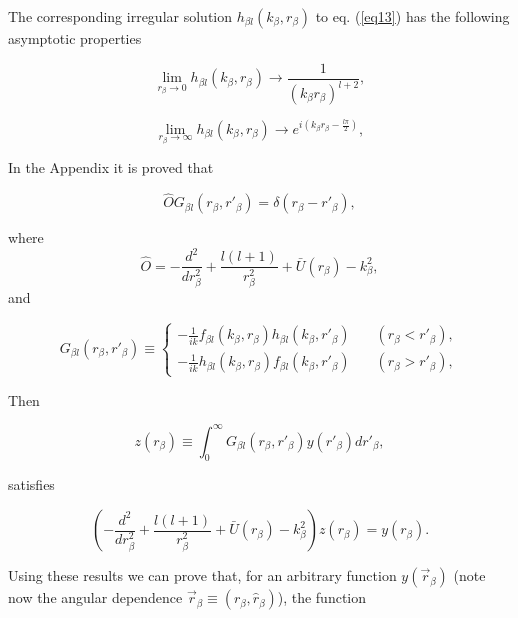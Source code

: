 The corresponding irregular solution $h_{\beta l}( k_ \beta, r_ \beta)$ to eq. (\ref{eq13}) has the following asymptotic properties


 \begin{equation}\label{eq16}
\lim_{r_\beta \rightarrow 0} h_{\beta l}( k_ \beta, r_ \beta) \longrightarrow
\frac{1}{(k_ \beta r_ \beta)^{l+2}},
\end{equation}

 \begin{equation}\label{eq17}
\lim_{r_\beta \rightarrow \infty} h_{\beta l}( k_ \beta, r_ \beta) \longrightarrow
e^{i(k_ \beta r_ \beta -\frac{l\pi}{2})},
\end{equation}

In the Appendix it is proved that

 \begin{equation}\label{eq18}
\hat O G_{\beta l} ( r_ \beta, r'_ \beta)=\delta(r_ \beta-r'_ \beta),
\end{equation}

where
 \begin{equation}\label{eq19}
\hat O=-\frac{d^2}{dr^2_\beta}+\frac{l(l+1)}{r^2_\beta}+\bar U (r_ \beta)-k_\beta^2,
\end{equation}
and

 \begin{equation}\label{eq20}
G_{\beta l} ( r_ \beta, r'_ \beta) \equiv \left \lbrace \begin{aligned}
-\frac{1}{ik} f_{\beta l}( k_ \beta, r_ \beta) h_{\beta l}( k_ \beta, r'_ \beta) &\quad( r_ \beta< r'_ \beta),\\
-\frac{1}{ik} h_{\beta l}( k_ \beta, r_ \beta) f_{\beta l}( k_ \beta, r'_ \beta) &\quad( r_ \beta>r'_ \beta),
\end{aligned}
\right.
\end{equation}

Then

 \begin{equation}\label{eq21}
z(r_ \beta) \equiv \int _0^\infty G_{\beta l} ( r_ \beta, r'_ \beta) y(r'_ \beta) dr'_ \beta,
\end{equation}

satisfies

\begin{equation}\label{eq22}
\left( -\frac{d^2}{dr^2_\beta}+\frac{l(l+1)}{r^2_\beta}+\bar U (r_ \beta)-k_\beta^2\right) z(r_ \beta)= y(r_ \beta).
\end{equation}


Using these results we can prove that, for an arbitrary function $y(\vec r_ \beta)$ (note now the angular dependence $\vec r_ \beta \equiv (r_ \beta ,\hat r_ \beta )$), the function


